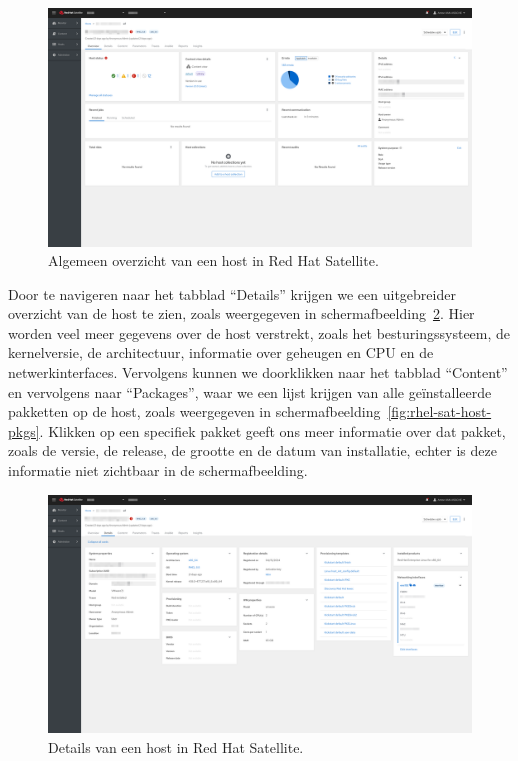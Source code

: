 \begin{figure}[h!]
    \includegraphics[width=\textwidth]
    {./graphics/state-of-the-art/rhel-satellite/rhel-sat-host-overview.png}
    \caption{\label{fig:rhel-sat-host-overview}Algemeen overzicht van een host in Red Hat Satellite.}
\end{figure}

Door te navigeren naar het tabblad ``Details'' krijgen we een uitgebreider overzicht van de host te zien, zoals weergegeven in schermafbeelding~\ref{fig:rhel-sat-host-details}.
Hier worden veel meer gegevens over de host verstrekt, zoals het besturingssysteem, de kernelversie, de architectuur, informatie over geheugen en CPU en de netwerkinterfaces.
Vervolgens kunnen we doorklikken naar het tabblad ``Content'' en vervolgens naar ``Packages'', waar we een lijst krijgen van alle ge\"installeerde pakketten op de host, zoals weergegeven in schermafbeelding~\ref{fig:rhel-sat-host-pkgs}.
Klikken op een specifiek pakket geeft ons meer informatie over dat pakket, zoals de versie, de release, de grootte en de datum van installatie, echter is deze informatie niet zichtbaar in de schermafbeelding.

\begin{figure}[h!]
    \includegraphics[width=\textwidth]
    {./graphics/state-of-the-art/rhel-satellite/rhel-sat-host-details.png}
    \caption{\label{fig:rhel-sat-host-details}Details van een host in Red Hat Satellite.}
\end{figure}

